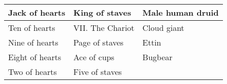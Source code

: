\begin{longtable}{llllll}
{\begin{minipage}[t]{1.102in}
Jack of hearts\end{minipage}} & \multicolumn{1}{p{1.207in}|}{\begin{minipage}[t]{1.207in}\raggedright
King of staves\end{minipage}} & \multicolumn{4}{p{2.191in}|}{\begin{minipage}[t]{2.191in}\raggedright
Male human druid\end{minipage}}\\
\hline
\multicolumn{1}{p{0.059in}|}{\begin{minipage}[t]{0.059in}\raggedright
Ten of hearts\end{minipage}} & \multicolumn{1}{p{0.059in}|}{\begin{minipage}[t]{0.059in}\raggedright
VII. The Chariot\end{minipage}} & \multicolumn{1}{p{0.059in}|}{\begin{minipage}[t]{0.059in}\raggedright
Cloud giant\end{minipage}}\\
\hline
\multicolumn{1}{|p{1.102in}|}{\begin{minipage}[t]{1.102in}\raggedright
Nine of hearts\end{minipage}} & \multicolumn{1}{p{1.207in}|}{\begin{minipage}[t]{1.207in}\raggedright
Page of staves\end{minipage}} & \multicolumn{4}{p{2.191in}|}{\begin{minipage}[t]{2.191in}\raggedright
Ettin\end{minipage}}\\
\hline
\multicolumn{1}{|p{1.102in}|}{\begin{minipage}[t]{1.102in}\raggedright
Eight of hearts\end{minipage}} & \multicolumn{1}{p{1.207in}|}{\begin{minipage}[t]{1.207in}\raggedright
Ace of cups\end{minipage}} & \multicolumn{4}{p{2.191in}|}{\begin{minipage}[t]{2.191in}\raggedright
Bugbear\end{minipage}}\\
\hline
\multicolumn{1}{|p{1.102in}|}{\begin{minipage}[t]{1.102in}\raggedright
Two of hearts\end{minipage}} & \multicolumn{1}{p{1.207in}|}{\begin{minipage}[t]{1.207in}\raggedright
Five of staves\end{minipage}} & \multicolumn{4}{p{2.191in}|}{\begin{minipage}[t]{2.191in}\raggedright

\end{minipage}}
\end{longtable}
